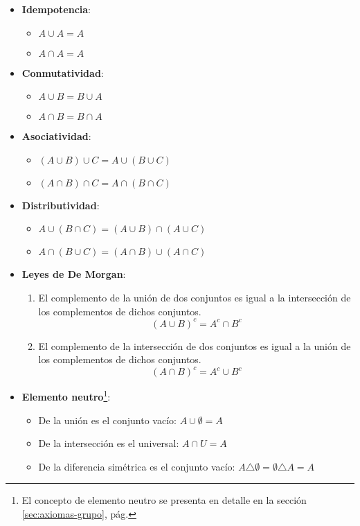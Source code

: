 \begin{itemize}
	\item \textbf{Idempotencia}:
	\begin{itemize}[itemsep=0pt]
		\item \( A \cup A = A \)
		\item \( A \cap A = A \)
	\end{itemize}
	\item \textbf{Conmutatividad}:
	\begin{itemize}[itemsep=0pt]
		\item \(A \cup B = B \cup A\)
		\item \(A \cap B = B \cap A\)
	\end{itemize}
	
	\item \textbf{Asociatividad}:
	\begin{itemize}[itemsep=0pt]
		\item \((A \cup B) \cup C = A \cup (B \cup C)\)
		\item \((A \cap B) \cap C = A \cap (B \cap C)\)
	\end{itemize}
	
	\item \textbf{Distributividad}:
	\begin{itemize}[itemsep=0pt]
		\item \(A \cup (B \cap C) = (A \cup B) \cap (A \cup C)\)
		\item \(A \cap (B \cup C) = (A \cap B) \cup (A \cap C)\)
	\end{itemize}
		
	\item \textbf{Leyes de De Morgan}:
	
	\begin{enumerate}[label={\textbf{\arabic*})}]
		\item El complemento de la unión de dos conjuntos es igual a la intersección de los complementos de dichos conjuntos.
		\[ (A \cup B)^c = A^c \cap B^c \]
		
		\item El complemento de la intersección de dos conjuntos es igual a la unión de los complementos de dichos conjuntos.
		\[ (A \cap B)^c = A^c \cup B^c \]
	\end{enumerate}
	
	\item\textbf{Elemento neutro}\footnote{El concepto de elemento neutro se presenta en detalle en la sección \ref{sec:axiomas-grupo}, pág. \pageref{sec:axiomas-grupo}}:
	\begin{itemize}
		\item De la unión es el conjunto vacío: \(A \cup \emptyset = A\)
		\item De la intersección es el universal: \(A \cap U = A\)
		\item De la diferencia simétrica es el conjunto vacío: \( A \triangle \emptyset = \emptyset \triangle A = A \)
	\end{itemize}
	

\end{itemize}

